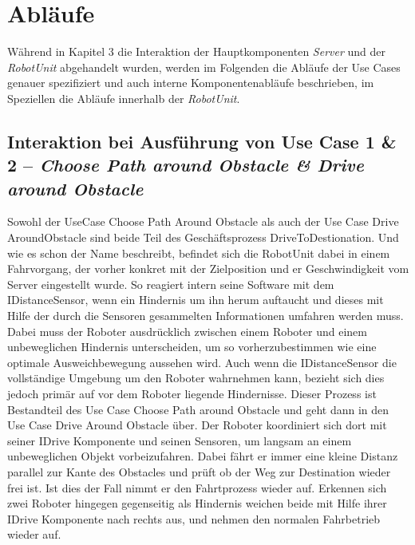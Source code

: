 \section{Abläufe}

Während in Kapitel 3 die Interaktion der Hauptkomponenten \emph{Server} und der \emph{RobotUnit} abgehandelt wurden, werden im Folgenden die Abläufe der Use Cases genauer spezifiziert und auch interne Komponentenabläufe beschrieben, im Speziellen die Abläufe innerhalb der \emph{RobotUnit}.
	
	\subsection*{Interaktion bei Ausführung von Use Case 1 \& 2 – \emph{Choose Path around Obstacle \& Drive around Obstacle}}
	Sowohl der UseCase Choose Path Around Obstacle als auch der Use Case Drive AroundObstacle sind beide Teil des Geschäftsprozess DriveToDestionation.  Und wie es schon der Name beschreibt, befindet sich die RobotUnit dabei in einem Fahrvorgang, der vorher konkret mit der Zielposition und er Geschwindigkeit vom Server eingestellt wurde. So reagiert intern seine Software mit dem IDistanceSensor, wenn ein Hindernis um ihn herum auftaucht und dieses mit Hilfe der durch die Sensoren gesammelten Informationen umfahren werden muss. Dabei muss der Roboter ausdrücklich zwischen einem Roboter und einem unbeweglichen Hindernis unterscheiden, um so vorherzubestimmen wie eine optimale Ausweichbewegung aussehen wird. Auch wenn die IDistanceSensor die vollständige Umgebung um den Roboter wahrnehmen kann, bezieht sich dies jedoch primär auf vor dem Roboter liegende Hindernisse. Dieser Prozess ist Bestandteil des Use Case Choose Path around Obstacle und geht dann in den Use Case Drive Around Obstacle über. Der Roboter koordiniert sich dort mit seiner IDrive Komponente und seinen Sensoren, um langsam an einem unbeweglichen Objekt vorbeizufahren. Dabei fährt er immer eine kleine Distanz parallel zur Kante des Obstacles und prüft ob der Weg zur Destination wieder frei ist. Ist dies der Fall nimmt er den Fahrtprozess wieder auf. Erkennen sich zwei Roboter hingegen gegenseitig als Hindernis weichen beide mit Hilfe ihrer IDrive Komponente nach rechts aus, und nehmen den normalen Fahrbetrieb wieder auf. \\
	
